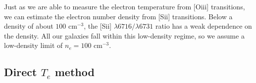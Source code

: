 Just as we are able to measure the electron temperature from [O{\sc iii}] 
transitions, we can estimate the electron number density from [S{\sc ii}] 
transitions.  Below a density of about $100 \text{ cm}^{-3}$, the [S{\sc ii}] 
$\lambda 6716 / \lambda 6731$ ratio has a weak dependence on the density.  All 
our galaxies fall within this low-density regime, so we assume a low-density 
limit of $n_e = 100 \text{ cm}^{-3}$.

%


\subsection{Direct $T_e$ method}

